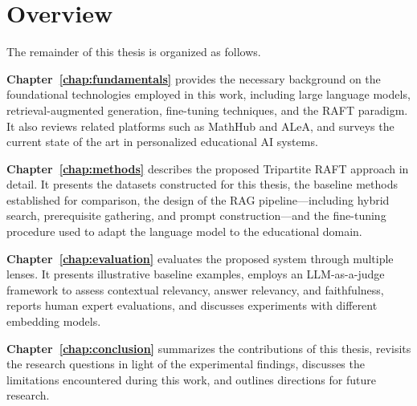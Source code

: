 



\section{Overview}

The remainder of this thesis is organized as follows.

\textbf{Chapter~\ref{chap:fundamentals}} provides the necessary background on the foundational technologies employed in this work, including large language models, retrieval-augmented generation, fine-tuning techniques, and the RAFT paradigm. It also reviews related platforms such as MathHub and ALeA, and surveys the current state of the art in personalized educational AI systems.

\textbf{Chapter~\ref{chap:methods}} describes the proposed Tripartite RAFT approach in detail. It presents the datasets constructed for this thesis, the baseline methods established for comparison, the design of the RAG pipeline---including hybrid search, prerequisite gathering, and prompt construction---and the fine-tuning procedure used to adapt the language model to the educational domain.

\textbf{Chapter~\ref{chap:evaluation}} evaluates the proposed system through multiple lenses. It presents illustrative baseline examples, employs an LLM-as-a-judge framework to assess contextual relevancy, answer relevancy, and faithfulness, reports human expert evaluations, and discusses experiments with different embedding models.

\textbf{Chapter~\ref{chap:conclusion}} summarizes the contributions of this thesis, revisits the research questions in light of the experimental findings, discusses the limitations encountered during this work, and outlines directions for future research.
